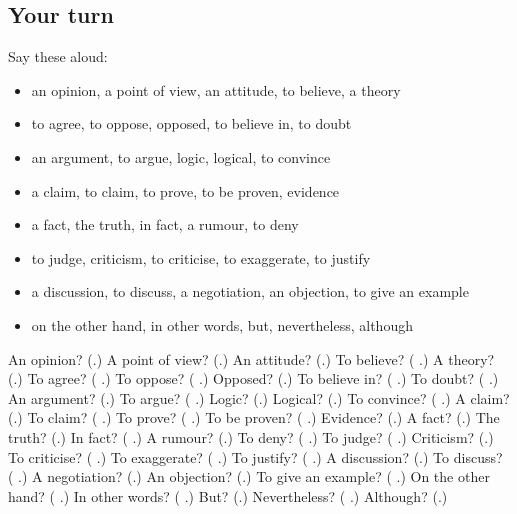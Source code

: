 \subsection*{Your turn}
Say these aloud:

\begin{itemize}
\raggedright
  \item an opinion, a point of view, an attitude, to believe, a theory
  \item to agree, to oppose, opposed, to believe in, to doubt
  \item an argument, to argue, logic, logical, to convince
  \item a claim, to claim, to prove, to be proven, evidence
  \item a fact, the truth, in fact, a rumour, to deny
  \item to judge, criticism, to criticise, to exaggerate, to justify
  \item a discussion, to discuss, a negotiation, an objection, to give an example
  \item on the other hand, in other words, but, nevertheless, although
\end{itemize}

\begin{tcolorbox}[breakable,colback=teal!4,colframe=teal!35!black,title={Before you move on}]
An opinion? (\textbf{}.) A point of view? (\textbf{}.) An attitude? (\textbf{}.) To believe? (\textbf{ }.) A theory? (\textbf{}.) To agree? (\textbf{ }.) To oppose? (\textbf{ }.) Opposed? (\textbf{}.) To believe in? (\textbf{ }.) To doubt? (\textbf{ }.) An argument? (\textbf{}.) To argue? (\textbf{ }.) Logic? (\textbf{}.) Logical? (\textbf{}.) To convince? (\textbf{ }.) A claim? (\textbf{}.) To claim? (\textbf{ }.) To prove? (\textbf{ }.) To be proven? (\textbf{ }.) Evidence? (\textbf{}.) A fact? (\textbf{}.) The truth? (\textbf{}.) In fact? (\textbf{ }.) A rumour? (\textbf{}.) To deny? (\textbf{ }.) To judge? (\textbf{ }.) Criticism? (\textbf{}.) To criticise? (\textbf{ }.) To exaggerate? (\textbf{ }.) To justify? (\textbf{ }.) A discussion? (\textbf{}.) To discuss? (\textbf{ }.) A negotiation? (\textbf{}.) An objection? (\textbf{}.) To give an example? (\textbf{ }.) On the other hand? (\textbf{  }.) In other words? (\textbf{  }.) But? (\textbf{}.) Nevertheless? (\textbf{  }.) Although? (\textbf{}.)
\end{tcolorbox}
